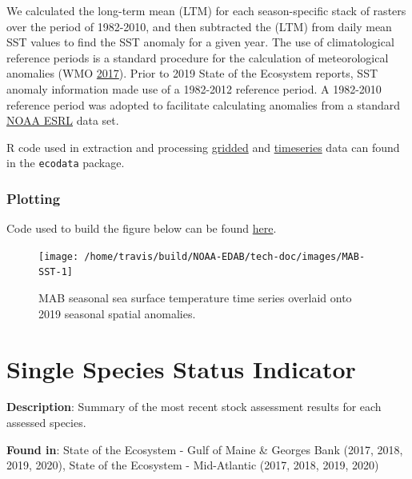 \documentclass[
]{book}
\begin{document}
We calculated the long-term mean (LTM) for each season-specific stack of rasters over the period of 1982-2010, and then subtracted the (LTM) from daily mean SST values to find the SST anomaly for a given year. The use of climatological reference periods is a standard procedure for the calculation of meteorological anomalies (WMO \protect\hyperlink{ref-WMO2017}{2017}). Prior to 2019 State of the Ecosystem reports, SST anomaly information made use of a 1982-2012 reference period. A 1982-2010 reference period was adopted to facilitate calculating anomalies from a standard \href{https://www.esrl.noaa.gov/psd/data/gridded/data.noaa.oisst.v2.highres.html}{NOAA ESRL} data set.

R code used in extraction and processing \href{https://github.com/NOAA-EDAB/ecodata/blob/master/data-raw/get_seasonal_oisst_anom_gridded.R}{gridded} and \href{https://github.com/NOAA-EDAB/ecodata/blob/master/data-raw/get_seasonal_oisst_anom.R}{timeseries} data can found in the \texttt{ecodata} package.

\hypertarget{plotting-27}{%
\subsection{Plotting}\label{plotting-27}}

Code used to build the figure below can be found \href{https://github.com/NOAA-EDAB/ecodata/blob/master/chunk-scripts/LTL.Rmd-MAB-SST-insitu.R}{here}.

\begin{figure}

{\centering \texttt{[image: /home/travis/build/NOAA-EDAB/tech-doc/images/MAB-SST-1]} 

}

\caption{MAB seasonal sea surface temperature time series overlaid onto 2019 seasonal spatial anomalies.}\label{fig:MAB-SST}
\end{figure}

\hypertarget{stockstatus}{%
\chapter{Single Species Status Indicator}\label{stockstatus}}

\textbf{Description}: Summary of the most recent stock assessment results for each assessed species.

\textbf{Found in}: State of the Ecosystem - Gulf of Maine \& Georges Bank (2017, 2018, 2019, 2020), State of the Ecosystem - Mid-Atlantic (2017, 2018, 2019, 2020)
\end{document}
